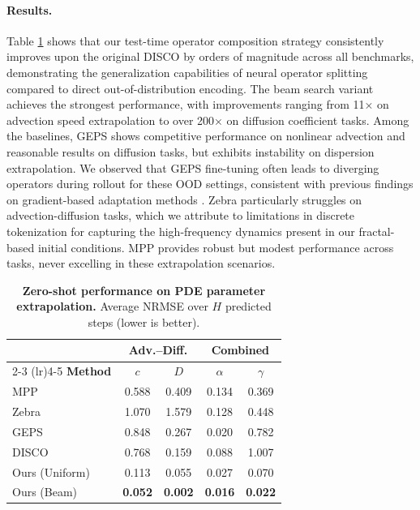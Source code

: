 \documentclass{article}
\theoremstyle{plain}
\theoremstyle{definition}
\theoremstyle{remark}
\begin{document}
\paragraph{Results.}
Table \ref{tab:parameter_extrapolation} shows that
our test-time operator composition strategy consistently improves upon the original DISCO by orders of magnitude across all benchmarks,
demonstrating the generalization capabilities of neural operator splitting compared to direct out-of-distribution encoding. 
The beam search variant achieves the strongest performance, with improvements ranging from 11× on advection speed extrapolation to over 200× on diffusion coefficient tasks. Among the baselines, GEPS shows competitive performance on nonlinear advection and reasonable results on diffusion tasks, but exhibits instability on dispersion extrapolation. We observed that GEPS fine-tuning often leads to diverging operators during rollout for these OOD settings, consistent with previous findings on gradient-based adaptation methods \citep{serrano2025zebra}. Zebra particularly struggles on advection-diffusion tasks, which we attribute to limitations in discrete tokenization for capturing the high-frequency dynamics present in our fractal-based initial conditions. MPP provides robust but modest performance across tasks, never excelling in these extrapolation scenarios. 


\begin{table}[t]
\centering
\caption{
\textbf{Zero-shot performance on PDE parameter extrapolation.}
Average NRMSE over $H$ predicted steps (lower is better).
}
\label{tab:parameter_extrapolation}

\setlength{\tabcolsep}{5pt} %
\small %

\begin{tabular}{lcccc}
\toprule
& \multicolumn{2}{c}{\textbf{Adv.–Diff.}} & \multicolumn{2}{c}{\textbf{Combined}} \\
\cmidrule(lr){2-3} \cmidrule(lr){4-5}
\textbf{Method} & $c$ & $D$ & $\alpha$ & $\gamma$ \\
\midrule
MPP & 0.588 & 0.409 & 0.134 & 0.369 \\
Zebra & 1.070 & 1.579 & 0.128 & 0.448 \\
GEPS & 0.848 & 0.267 & 0.020 & 0.782 \\
DISCO & 0.768 & 0.159 & 0.088 & 1.007 \\
\midrule
Ours (Uniform) & 0.113 & 0.055 & 0.027 & 0.070 \\
Ours (Beam) & \textbf{0.052} & \textbf{0.002} & \textbf{0.016} & \textbf{0.022} \\
\bottomrule
\end{tabular}
\end{table}
\end{document}
